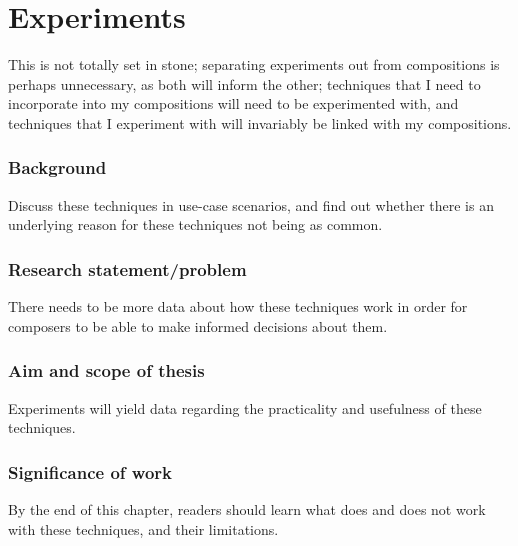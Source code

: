 
\chapter{Experiments}
This is not totally set in stone; separating experiments out from compositions is perhaps unnecessary, as both will inform the other; techniques that I need to incorporate into my compositions will need to be experimented with, and techniques that I experiment with will invariably be linked with my compositions.
\subsection{Background}
Discuss these techniques in use-case scenarios, and find out whether there is an underlying reason for these techniques not being as common.
\subsection{Research statement/problem}
There needs to be more data about how these techniques work in order for composers to be able to make informed decisions about them.
\subsection{Aim and scope of thesis}
Experiments will yield data regarding the practicality and usefulness of these techniques.
\subsection{Significance of work}
By the end of this chapter, readers should learn what does and does not work with these techniques, and their limitations.




